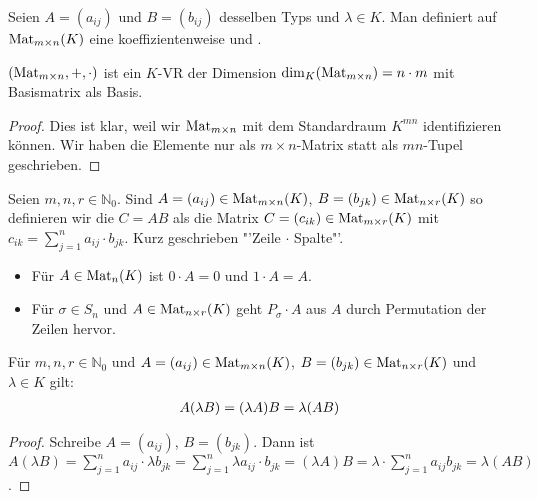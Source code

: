 \begin{definition}
	Seien $A=(a_{ij})$ und $B=(b_{ij})$ desselben Typs und 
	$\lambda \in K$. Man definiert auf $\operatorname{Mat}_{m\times n}(K)$ eine koeffizientenweise  und .
\end{definition}

\begin{proposition}
	$(\operatorname{Mat}_{m\times n},+,\cdot)$ ist ein $K$-VR der Dimension $\dim_K(\operatorname{Mat}_{m\times n})=n\cdot m$ mit 
	Basismatrix als Basis.
\end{proposition}
\begin{proof}
	Dies ist klar, weil wir $\operatorname{Mat}_{m\times n}$ mit dem Standardraum $K^{mn}$ identifizieren können. Wir haben die 
	Elemente nur als $m\times n$-Matrix statt als $mn$-Tupel geschrieben.
\end{proof}

\begin{definition}[Matrizenmultiplikation]
	Seien $m,n,r \in \mathbb N_0$. Sind $A=(a_{ij})\in \operatorname{Mat}_{m\times n}(K)$, 
	$B=(b_{jk})\in \operatorname{Mat}_{n\times r}(K)$ so definieren wir die  $C=AB$ als die Matrix $C=(c_{ik})\in \operatorname{Mat}_{m\times r}(K)$ mit 
	$c_{ik}=\sum_{j=1}^n a_{ij}\cdot b_{jk}$. Kurz geschrieben "'Zeile $\cdot$ Spalte"'.
\end{definition}

\begin{example}
	\begin{itemize}
		\item Für $A\in \operatorname{Mat}_n(K)$ ist $0\cdot A=0$ und $1\cdot A=A$.
		\item Für $\sigma \in S_n$ und $A\in \operatorname{Mat}_{n\times r}(K)$ geht $P_{\sigma}\cdot A$ aus $A$ durch Permutation der 
		Zeilen hervor.
	\end{itemize}
\end{example}

\begin{lemma}
	Für $m,n,r \in \mathbb N_0$ und $A=(a_{ij})\in \operatorname{Mat}_{m\times n}(K)$, $B=(b_{jk})\in \operatorname{Mat}_
	{n\times r}(K)$ und $\lambda\in K$ gilt:
	\begin{align}
		A(\lambda B)=(\lambda A)B=\lambda(AB)\notag
	\end{align}
\end{lemma}
\begin{proof}
	Schreibe $A=(a_{ij})$, $B=(b_{jk})$. Dann ist $A(\lambda B)=\sum_{j=1}^n a_{ij}\cdot \lambda b_{jk}=\sum
	_{j=1}^n \lambda a_{ij} \cdot b_{jk}=(\lambda A)B=\lambda \cdot \sum_{j=1}^n a_{ij}b_{jk}=\lambda
	(AB)$.
\end{proof}

